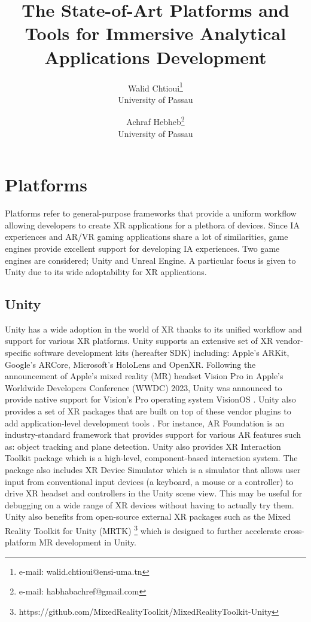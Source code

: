 \documentclass{vgtc}                          %
\title{The State-of-Art Platforms and Tools for Immersive Analytical
Applications Development}
\author{Walid Chtioui\thanks{e-mail: walid.chtioui@ensi-uma.tn}\\ %
        \scriptsize University of Passau %
\and Achraf Hebheb\thanks{e-mail: habhabachref@gmail.com}\\ %
     \scriptsize University of Passau}
\begin{document}
\maketitle



\section{Platforms}

Platforms refer to general-purpose frameworks that provide a uniform workflow
allowing developers to create XR applications for a plethora of devices. Since
IA experiences and AR/VR gaming applications share a lot of similarities, game
engines provide excellent support for developing IA experiences. Two game
engines are considered; Unity and Unreal Engine. A particular focus is given
to Unity due to its wide adoptability for XR applications.

\subsection{Unity}
Unity has a wide adoption in the world of XR thanks to its unified workflow
and support for various XR platforms. Unity supports an extensive set of XR
vendor-specific software development kits (hereafter SDK) including: Apple's
ARKit, Google's ARCore, Microsoft's HoloLens and OpenXR. Following the
announcement of Apple's mixed reality (MR) headset Vision Pro in Apple's
Worldwide Developers Conference (WWDC) 2023, Unity was announced to provide
native support for Vision's Pro operating system VisionOS \cite{web:vision_pro_unity}.
Unity also provides a set of XR packages that are built on top of these vendor
plugins to add application-level development tools \cite{unity:xr_packages}.
For instance, AR Foundation is an industry-standard framework that provides
support for various AR features such as: object tracking and plane detection.
Unity also provides XR Interaction Toolkit package which is a high-level,
component-based interaction system. The package also includes XR Device
Simulator which is a simulator that allows user input from conventional input
devices (a keyboard, a mouse or a controller) to drive XR headset and
controllers in the Unity scene view. This may be useful for debugging on a
wide range of XR devices without having to actually try them. Unity also
benefits from open-source external XR packages such as the Mixed Reality
Toolkit for Unity (MRTK)
\footnote{https://github.com/MixedRealityToolkit/MixedRealityToolkit-Unity}
which is designed to further accelerate cross-platform MR development in Unity.
\end{document}

